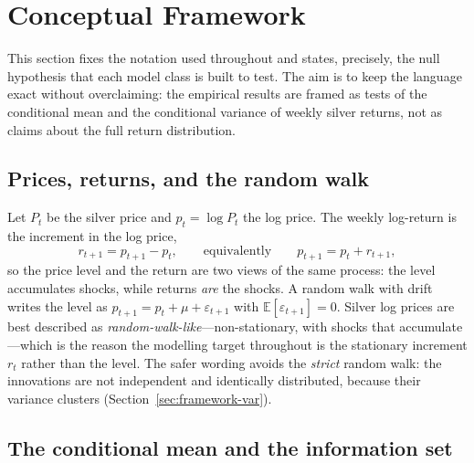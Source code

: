 \documentclass[12pt, a4paper]{article}
\newcommand{\E}{\mathbb{E}}
\begin{document}
\section{Conceptual Framework}
\label{sec:framework}


This section fixes the notation used throughout and states, precisely, the null hypothesis that
each model class is built to test. The aim is to keep the language exact without
overclaiming: the empirical results are framed as tests of the conditional mean and the
conditional variance of weekly silver returns, not as claims about the full return
distribution.

\subsection{Prices, returns, and the random walk}
\label{sec:framework-rw}

Let \(P_t\) be the silver price and \(p_t = \log P_t\) the log price. The weekly
log-return is the increment in the log price,
\begin{equation}
    r_{t+1} = p_{t+1} - p_t, \qquad\text{equivalently}\qquad p_{t+1} = p_t + r_{t+1},
\end{equation}
so the price level and the return are two views of the same process: the level
accumulates shocks, while returns \emph{are} the shocks. A random walk with drift writes
the level as \(p_{t+1} = p_t + \mu + \varepsilon_{t+1}\) with
\(\E[\varepsilon_{t+1}] = 0\). Silver log prices are best described as
\emph{random-walk-like}---non-stationary, with shocks that accumulate---which is the
reason the modelling target throughout is the stationary increment \(r_t\) rather than
the level. The safer wording avoids the \emph{strict} random walk: the innovations are
not independent and identically distributed, because their variance clusters
(Section~\ref{sec:framework-var}).

\subsection{The conditional mean and the information set}
\label{sec:framework-mds}
\end{document}
